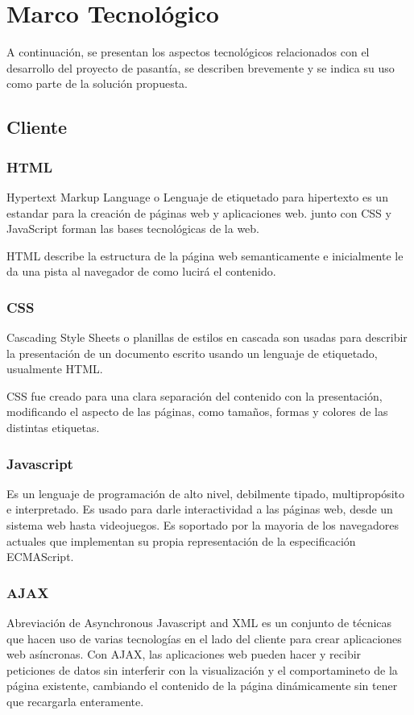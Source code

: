 \chapter{Marco Tecnológico}
\thispagestyle{empty} %

A continuación, se presentan los aspectos tecnológicos relacionados con el desarrollo del proyecto de pasantía, se describen brevemente y se indica su uso como parte de la solución propuesta.

\section{Cliente}

\subsection{HTML}

Hypertext Markup Language o Lenguaje de etiquetado para hipertexto es un estandar para la creación de páginas web y aplicaciones web. junto con CSS y JavaScript forman las bases tecnológicas de la web.

HTML describe la estructura de la página web semanticamente e inicialmente le da una pista al navegador de como lucirá el contenido.


\subsection{CSS}
Cascading Style Sheets o planillas de estilos en cascada son usadas para describir la presentación de un documento escrito usando un lenguaje de etiquetado, usualmente HTML. 

CSS fue creado para una clara separación del contenido con la presentación, modificando el aspecto de las páginas, como tamaños, formas y colores de las distintas etiquetas.

\subsection{Javascript}
Es un lenguaje de programación de alto nivel, debilmente tipado, multipropósito e interpretado. Es usado para darle interactividad a las páginas web, desde un sistema web hasta videojuegos. Es soportado por la mayoria de los navegadores actuales que implementan su propia representación de la especificación ECMAScript.

\subsection{AJAX}
Abreviación de Asynchronous Javascript and XML es un conjunto de técnicas que hacen uso de varias tecnologías en el lado del cliente para crear aplicaciones web asíncronas. Con AJAX, las aplicaciones web pueden hacer y recibir peticiones de datos sin interferir con la visualización y el comportamineto de la página existente, cambiando el contenido de la página dinámicamente sin tener que recargarla enteramente.

